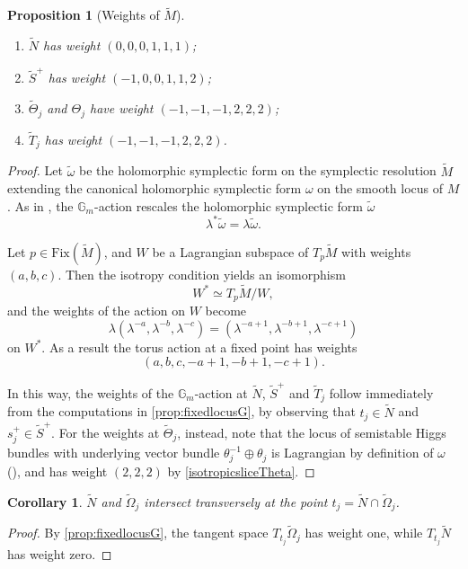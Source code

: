 \documentclass[JEP,XML,SOM,Unicode, NoEqCountersInSection,NoFloatCountersInSection,published]{cedram}
\newtheorem{cor}[thm]{Corollary}
\newtheorem{prop}[thm]{Proposition}
\theoremstyle{definition}
\newcommand{\Gm}{\mathbb{G}_m}
\newcommand{\tm}{\widetilde{M}}
\newcommand{\tomega}{\widetilde{\Omega}}
\let\NBun N
\begin{document}
\skpt
\begin{prop}[Weights of $\widetilde{M}$]\label{prop:weight}
\begin{enumerate}
\item\label{item:wP3} $\widetilde{\NBun}$ has weight $(0,0,0,1,1,1)$;
\item\label{item:wS+} $\widetilde{S}^+$ has weight $(-1,0,0,1,1,2)$;
\item\label{item:wTheta} $\widetilde{\Theta}_j$ and $\Theta_j$ have weight $(-1,-1,-1,2,2,2)$;
\item\label{item:wTj} $\widetilde{T}_j$ has weight $(-1,-1,-1,2,2,2)$.
\end{enumerate}
\end{prop}
\begin{proof}
Let $\widetilde{\omega}$ be the holomorphic symplectic form on the symplectic resolution $\widetilde{M}$ extending the canonical holomorphic symplectic form $\omega$ on the smooth locus of $M$.
As in \cite[Prop.\,7.1]{Hitchin1987}, the $\Gm$\nobreakdash-action rescales the holomorphic symplectic form $\widetilde{\omega}$
\[
\lambda^*\widetilde{\omega} = \lambda \widetilde{\omega}.
\]

Let $p\in \mathrm{Fix}(\tm)$, and $W$ be a Lagrangian subspace of $T_p\tm$ with weights $(a,b,c)$. Then the isotropy condition yields an isomorphism
\[
W^*\simeq T_p\tm/W,
\]
and the weights of the action on $W$ become
\[
\lambda (\lambda^{-a}, \lambda^{-b}, \lambda^{-c}) = (\lambda^{-a+1}, \lambda^{-b+1}, \lambda^{-c+1})
\]
on $W^*$. As a result the torus action at a fixed point has weights
\[
(a,b,c,-a+1,-b+1,-c+1).
\]

In this way, the weights of the $\Gm$\nobreakdash-action at $\widetilde{N}$, $\widetilde{S}^{+}$ and $\widetilde{T}_j$ follow immediately from the computations in \cref{prop:fixedlocusG}, by observing that $t_j \in \widetilde{N}$ and $s^{+}_j \in \widetilde{S}^{+}$. For the weights at $\widetilde{\Theta}_j$, instead, note that the locus of semistable Higgs bundles with underlying vector bundle $\theta^{-1}_j \oplus \theta_j$ is Lagrangian by definition of $\omega$ (\cf \cite[Lem.\,6.8]{Hitchin1987}), and has weight $(2,2,2)$ by \eqref{isotropicsliceTheta}.
\end{proof}

\begin{cor}\label{cor:tansverseintersection}
$\widetilde{\NBun}$ and $\tomega_j$ intersect transversely at the point $t_j = \widetilde{\NBun} \cap \tomega_j$.
\end{cor}
\begin{proof}
By \cref{prop:fixedlocusG}, the tangent space $T_{t_j}\tomega_j$ has weight one, while $T_{t_j}\widetilde{\NBun}$ has weight zero.
\end{proof}
\end{document}
